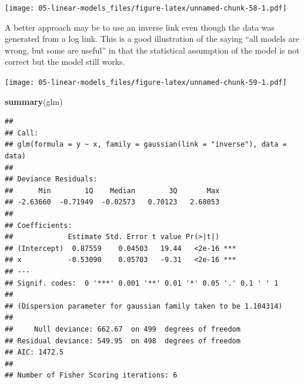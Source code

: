 \documentclass[
  openany]{book}
\newenvironment{Shaded}{\begin{snugshade}}{\end{snugshade}}
\newcommand{\DataTypeTok}[1]{\textcolor[rgb]{0.13,0.29,0.53}{#1}}
\newcommand{\DecValTok}[1]{\textcolor[rgb]{0.00,0.00,0.81}{#1}}
\newcommand{\FloatTok}[1]{\textcolor[rgb]{0.00,0.00,0.81}{#1}}
\newcommand{\KeywordTok}[1]{\textcolor[rgb]{0.13,0.29,0.53}{\textbf{#1}}}
\newcommand{\NormalTok}[1]{#1}
\newcommand{\OperatorTok}[1]{\textcolor[rgb]{0.81,0.36,0.00}{\textbf{#1}}}
\newcommand{\StringTok}[1]{\textcolor[rgb]{0.31,0.60,0.02}{#1}}
\begin{document}
\texttt{[image: 05-linear-models\_files/figure-latex/unnamed-chunk-58-1.pdf]}

A better approach may be to use an inverse link even though the data was generated from a log link. This is a good illustration of the saying ``all models are wrong, but some are useful'' in that the statistical assumption of the model is not correct but the model still works.

\begin{Shaded}
\end{Shaded}

\texttt{[image: 05-linear-models\_files/figure-latex/unnamed-chunk-59-1.pdf]}

\begin{Shaded}
\begin{Highlighting}[]
\KeywordTok{summary}\NormalTok{(glm)}
\end{Highlighting}
\end{Shaded}

\begin{verbatim}
## 
## Call:
## glm(formula = y ~ x, family = gaussian(link = "inverse"), data = data)
## 
## Deviance Residuals: 
##      Min        1Q    Median        3Q       Max  
## -2.63660  -0.71949  -0.02573   0.70123   2.68053  
## 
## Coefficients:
##             Estimate Std. Error t value Pr(>|t|)    
## (Intercept)  0.87559    0.04503   19.44   <2e-16 ***
## x           -0.53090    0.05703   -9.31   <2e-16 ***
## ---
## Signif. codes:  0 '***' 0.001 '**' 0.01 '*' 0.05 '.' 0.1 ' ' 1
## 
## (Dispersion parameter for gaussian family taken to be 1.104314)
## 
##     Null deviance: 662.67  on 499  degrees of freedom
## Residual deviance: 549.95  on 498  degrees of freedom
## AIC: 1472.5
## 
## Number of Fisher Scoring iterations: 6
\end{verbatim}
\end{document}
